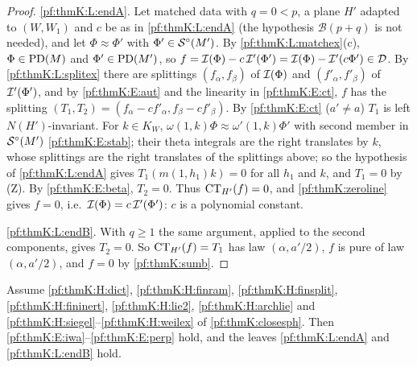 \begin{proof}
\ref{pf:thmK:L:endA}. Let matched data with $q=0<p$, a plane $H'$ adapted to $(W,W_1)$ and $c$ be as in
\ref{pf:thmK:L:endA} (the hypothesis $\mathcal B(p+q)$ is not needed), and let $\Phi\approx\Phi'$ with $\Phi'\in\mathcal{S}^{\circ}(M')$.
By \ref{pf:thmK:L:matchex}(c), $\Phi\in\operatorname{PD}(M)$ and $\Phi'\in\operatorname{PD}(M')$, so $f=\mathcal{I}(\Phi)-c\,\mathcal{I}'(\Phi')=
\mathcal{I}(\Phi)-\mathcal{I}'(c\Phi')\in\mathcal D$. By \ref{pf:thmK:L:splitex} there are splittings $(f_\alpha,f_\beta)$ of
$\mathcal{I}(\Phi)$ and $(f'_\alpha,f'_\beta)$ of $\mathcal{I}'(\Phi')$, and by \ref{pf:thmK:E:aut} and the linearity in
\ref{pf:thmK:E:ct}, $f$ has the splitting $(T_1,T_2)=(f_\alpha-cf'_\alpha,f_\beta-cf'_\beta)$. By \ref{pf:thmK:E:ct} ($a'\ne
a$) $T_1$ is left $N(H')$-invariant. For $k\in K_W$, $\omega(1,k)\Phi\approx\omega'(1,k)\Phi'$ with second member in
$\mathcal{S}^{\circ}(M')$ \ref{pf:thmK:E:stab}; their theta integrals are the right translates by $k$, whose splittings are the right
translates of the splittings above; so the hypothesis of \ref{pf:thmK:L:endA} gives $T_1(m(1,h_1)k)=0$ for all $h_1$ and
$k$, and $T_1=0$ by (Z). By \ref{pf:thmK:E:beta}, $T_2=0$. Thus $\operatorname{CT}_{H'}(f)=0$, and \cref{pf:thmK:zeroline} gives
$f=0$, i.e.\ $\mathcal{I}(\Phi)=c\,\mathcal{I}'(\Phi')$: $c$ is a polynomial constant.

\ref{pf:thmK:L:endB}. With $q\ge1$ the same argument, applied to the second components, gives $T_2=0$. So
$\operatorname{CT}_{H'}(f)=T_1$ has law $(\alpha,a'/2)$, $f$ is pure of law $(\alpha,a'/2)$, and $f=0$ by \cref{pf:thmK:sumb}.
\end{proof}

\begin{theorem}\label{pf:thmK:endsteps}
Assume \ref{pf:thmK:H:dict}, \ref{pf:thmK:H:finram}, \ref{pf:thmK:H:finsplit}, \ref{pf:thmK:H:fininert},
\ref{pf:thmK:H:lie2}, \ref{pf:thmK:H:archlie} and \ref{pf:thmK:H:siegel}--\ref{pf:thmK:H:weilex} of
\cref{pf:thmK:closesph}. Then \ref{pf:thmK:E:iwa}--\ref{pf:thmK:E:perp} hold, and the leaves \ref{pf:thmK:L:endA} and
\ref{pf:thmK:L:endB} hold.
\end{theorem}

